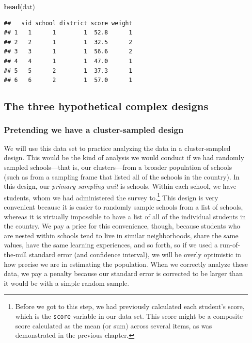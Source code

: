 \documentclass[
]{article}
\newenvironment{Shaded}{\begin{snugshade}}{\end{snugshade}}
\newcommand{\KeywordTok}[1]{\textcolor[rgb]{0.13,0.29,0.53}{\textbf{#1}}}
\newcommand{\NormalTok}[1]{#1}
\begin{document}
\begin{Shaded}
\begin{Highlighting}[]
\KeywordTok{head}\NormalTok{(dat)}
\end{Highlighting}
\end{Shaded}

\begin{verbatim}
##   sid school district score weight
## 1   1      1        1  52.8      1
## 2   2      1        1  32.5      2
## 3   3      1        1  56.6      2
## 4   4      1        1  47.0      1
## 5   5      2        1  37.3      1
## 6   6      2        1  57.0      1
\end{verbatim}

\hypertarget{the-three-hypothetical-complex-designs}{%
\subsection{The three hypothetical complex designs}\label{the-three-hypothetical-complex-designs}}

\hypertarget{pretending-we-have-a-cluster-sampled-design}{%
\subsubsection{Pretending we have a cluster-sampled design}\label{pretending-we-have-a-cluster-sampled-design}}

We will use this data set to practice analyzing the data in a cluster-sampled design. This would be the kind of analysis we would conduct if we had randomly sampled schools---that is, our clusters---from a broader population of schools (such as from a sampling frame that listed all of the schools in the country). In this design, our \emph{primary sampling unit} is schools. Within each school, we have students, whom we had administered the survey to.\footnote{Before we got to this step, we had previously calculated each student's score, which is the \texttt{score} variable in our data set. This score might be a composite score calculated as the mean (or sum) across several items, as was demonstrated in the previous chapter.} This design is very convenient because it is easier to randomly sample schools from a list of schools, whereas it is virtually impossible to have a list of all of the individual students in the country. We pay a price for this convenience, though, because students who are nested within schools tend to live in similar neighborhoods, share the same values, have the same learning experiences, and so forth, so if we used a run-of-the-mill standard error (and confidence interval), we will be overly optimistic in how precise we are in estimating the population. When we correctly analyze these data, we pay a penalty because our standard error is corrected to be larger than it would be with a simple random sample.
\end{document}
